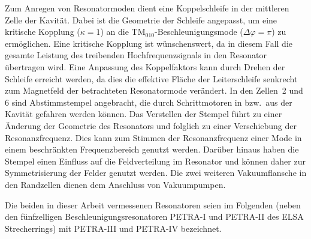 Zum Anregen von Resonatormoden dient eine Koppelschleife \cite{desy_schleife} in der mittleren Zelle der Kavität.
Dabei ist die Geometrie der Schleife angepasst, um eine kritische Kopplung ($\kappa = 1$) an die $\mathrm{TM}_{010}$-Beschleunigungs\-mode ($\Delta \varphi = \pi$) zu ermöglichen.
Eine kritische Kopplung ist wünschenswert, da in diesem Fall die gesamte Leistung des treibenden Hochfrequenzsignals in den Resonator übertragen wird.
Eine Anpassung des Koppelfaktors kann durch Drehen der Schleife erreicht werden, da dies die effektive Fläche der Leiterschleife senkrecht zum Magnetfeld der betrachteten Resonatormode verändert.
In den Zellen~2 und 6 sind Abstimmstempel \cite{desy_stempel} angebracht, die durch Schrittmotoren in bzw.\ aus der Kavität gefahren werden können.
Das Verstellen der Stempel führt zu einer Änderung der Geometrie des Resonators und folglich zu einer Verschiebung der Resonanzfrequenz.
Dies kann zum Stimmen der Resonanzfrequenz einer Mode in einem beschränkten Frequenzbereich genutzt werden.
Darüber hinaus haben die Stempel einen Einfluss auf die Feldverteilung im Resonator und können daher zur Symmetrisierung der Felder genutzt werden.
Die zwei weiteren Vakuumflansche in den Randzellen dienen dem Anschluss von Vakuumpumpen.

Die beiden in dieser Arbeit vermessenen Resonatoren seien im Folgenden (neben den fünfzelligen Beschleunigungsresonatoren PETRA-I und PETRA-II des ELSA Strecherrings) mit PETRA-III und PETRA-IV bezeichnet.


